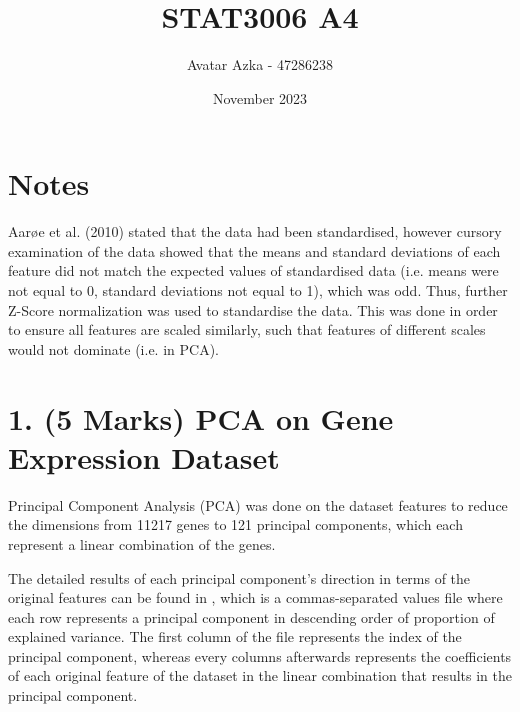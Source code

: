\documentclass[twocolumn]{article}
\title{STAT3006 A4}
\author{Avatar Azka - 47286238}
\date{November 2023}
\begin{document}
\onecolumn
\maketitle
\tableofcontents

\newpage
\twocolumn
\section{Notes}
Aarøe et al. (2010) \cite{Aarøe2010} stated that the data had been standardised, however cursory examination of the data showed that the means and standard deviations of each feature did not match the expected values of standardised data (i.e. means were not equal to 0, standard deviations not equal to 1), which was odd. Thus, further Z-Score normalization was used to standardise the data. This was done in order to ensure all features are scaled similarly, such that features of different scales would not dominate (i.e. in PCA). 

\section{1. (5 Marks) PCA on Gene Expression Dataset}
Principal Component Analysis (PCA) was done on the dataset features to reduce the dimensions from 11217 genes to 121 principal components, which each represent a linear combination of the genes. 

The detailed results of each principal component's direction in terms of the original features can be found in , which is a commas-separated values file where each row represents a principal component in descending order of proportion of explained variance. The first column of the file represents the index of the principal component, whereas every columns afterwards represents the coefficients of each original feature of the dataset in the linear combination that results in the principal component.
\end{document}
